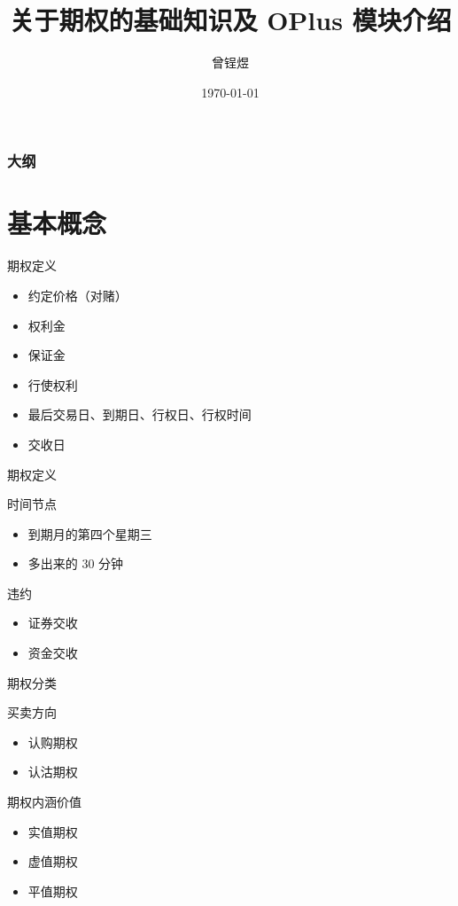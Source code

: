 \documentclass[12pt]{ctexbeamer}	%
\title[期权知识分享]{关于期权的基础知识及 OPlus 模块介绍}	%
\author[Zengyu Zeng]{曾锃煜}
\institute[Hundsun]{资管，研发四部}	%
\date{\today}
\begin{document}
\begin{frame}
\titlepage
\end{frame}


\begin{frame}
\frametitle{大纲}
\tableofcontents
\end{frame}


\section{基本概念}

\begin{frame}{期权定义}
  \begin{itemize} %
    \item 约定价格（对赌）
    \item 权利金
    \item 保证金
    \item 行使权利
    \item 最后交易日、到期日、行权日、行权时间
    \item 交收日
  \end{itemize}
\end{frame}

\begin{frame}{期权定义}
  \begin{block}{时间节点}
    \begin{itemize}
      \item 到期月的第四个星期三
      \item 多出来的 30 分钟
    \end{itemize}
  \end{block}
  \begin{block}{违约}
    \begin{itemize}
      \item 证券交收
      \item 资金交收
    \end{itemize}
  \end{block}
\end{frame}

\begin{frame}{期权分类}
  \begin{block}{买卖方向}
    \begin{itemize}
      \item 认购期权
      \item 认沽期权
    \end{itemize}
  \end{block}
  \begin{block}{期权内涵价值}
    \begin{itemize}
      \item 实值期权
      \item 虚值期权
      \item 平值期权
    \end{itemize}
  \end{block}
\end{frame}
\end{document}
